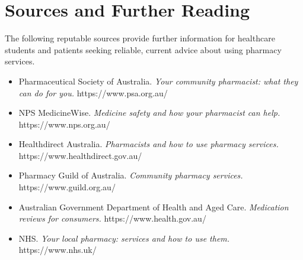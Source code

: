 \section*{Sources and Further Reading}
The following reputable sources provide further information for healthcare students and patients seeking reliable, current advice about using pharmacy services.

\begin{itemize}
    \item Pharmaceutical Society of Australia. \textit{Your community pharmacist: what they can do for you.} https://www.psa.org.au/
    \item NPS MedicineWise. \textit{Medicine safety and how your pharmacist can help.} https://www.nps.org.au/
    \item Healthdirect Australia. \textit{Pharmacists and how to use pharmacy services.} https://www.healthdirect.gov.au/
    \item Pharmacy Guild of Australia. \textit{Community pharmacy services.} https://www.guild.org.au/
    \item Australian Government Department of Health and Aged Care. \textit{Medication reviews for consumers.} https://www.health.gov.au/
    \item NHS. \textit{Your local pharmacy: services and how to use them.} https://www.nhs.uk/
\end{itemize}
